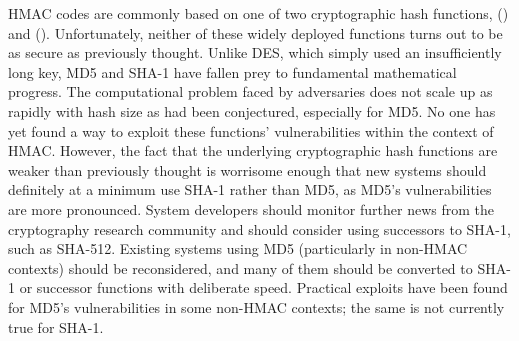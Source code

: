HMAC codes are commonly based on one of two cryptographic hash
functions,  () and 
().  Unfortunately, neither of these
widely deployed functions turns out to be as secure as previously
thought.  Unlike DES, which simply used an insufficiently long key,
MD5 and SHA-1 have fallen prey to fundamental mathematical progress.  The
computational problem faced by adversaries does not scale up as
rapidly with hash size as had been conjectured, especially for MD5.  No one has yet found
a way to exploit these functions' vulnerabilities within the context
of HMAC.
However, the fact that the underlying cryptographic hash functions are weaker than previously thought is
worrisome enough that new systems should definitely at a minimum use SHA-1 rather
than MD5, as MD5's vulnerabilities are more pronounced.  System developers should monitor further news from the
cryptography research community and should consider using successors
to SHA-1, such as SHA-512.  Existing systems using MD5 (particularly in non-HMAC
contexts) should be reconsidered, and many of them should be converted
to SHA-1 or successor functions with deliberate speed.  Practical
exploits have been found for MD5's vulnerabilities in some
non-HMAC contexts; the same is not currently true for SHA-1.

